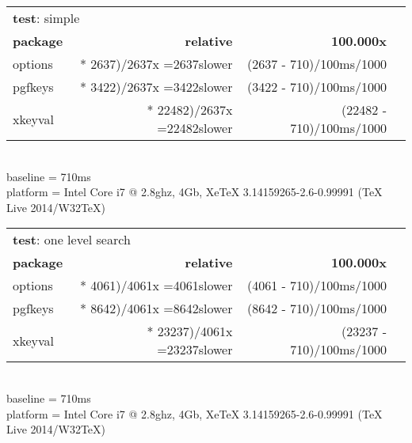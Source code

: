\documentclass{book}
\begin{document}
\newcommand\adjust[2][1]{%
  \the\numexpr (#2 - \baseline)/#1\relax ms/1000%
}
\newcommand\relative[1]{%
  \dotit{\the\numexpr(10 * #1)/\baserelative\relax}x \ifnum\baserelative=#1\relax\else slower\fi
}
\newcommand\dotit[1]{\expandafter\dotitx#1\relax}
\def\dotitx#1#2#3\relax{}

\newcommand\gentable[7][100]{%
  \def\baseline{#2}%
  \def\baserelative{#3}%
  \noindent\begin{tabular}{lrrl}\hline
  \multicolumn{3}{l}{\textbf{test}: #6} \\ 
  \textbf{package} & \textbf{relative} & \textbf{#1.000x} \\ 
  \hline
  options & \relative{#3} & \adjust[#1]{#3} \\
  pgfkeys & \relative{#4} & \adjust[#1]{#4} \\
  xkeyval & \relative{#5} & \adjust[#1]{#5} \\ \hline
  \end{tabular}\\[1ex]
  {baseline = \baseline ms} \\
  {platform = #7}\\
}

\newcommand\showresults{%
  
  \gentable{710}{2637}{3422}{22482}%
           {simple}%
           {Intel Core i7 @ 2.8ghz, 4Gb, XeTeX 3.14159265-2.6-0.99991 (TeX Live 2014/W32TeX)}

  \gentable{710}{4061}{8642}{23237}%
           {one level search}%
           {Intel Core i7 @ 2.8ghz, 4Gb, XeTeX 3.14159265-2.6-0.99991 (TeX Live 2014/W32TeX)}
}

%
 {\showresults}%
 {\ifcase{}\relax
  \or
  \or
  \or
  \or
  \else
  \fi
 }%
\end{document}
